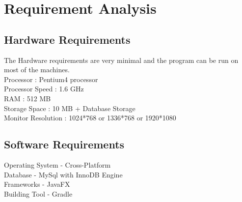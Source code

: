 \chapter{Requirement Analysis}

\section{Hardware Requirements}
The Hardware requirements are very minimal and the program can be run on most of
the machines. \\
Processor : Pentium4 processor\\
Processor Speed : 1.6 GHz\\
RAM : 512 MB\\
Storage Space : 10 MB + Database Storage\\
Monitor Resolution : 1024*768 or 1336*768 or 1920*1080\\
\thispagestyle{fancy}

\section{Software Requirements}
Operating System - Cross-Platform\\
Database - MySql with InnoDB Engine\\
Frameworks - JavaFX\\
Building Tool - Gradle
